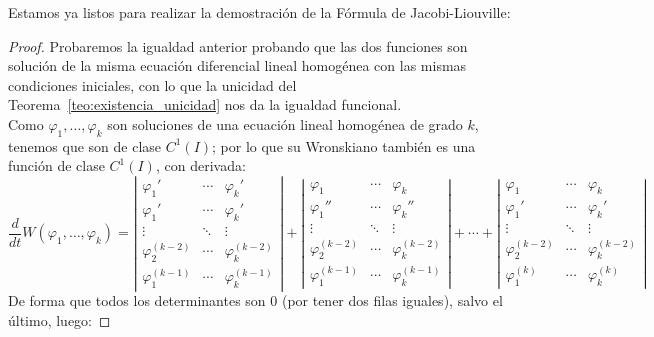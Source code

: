 \noindent
Estamos ya listos para realizar la demostración de la Fórmula de Jacobi-Liouville:
\begin{proof}
    Probaremos la igualdad anterior probando que las dos funciones son solución de la misma ecuación diferencial lineal homogénea con las mismas condiciones iniciales, con lo que la unicidad del Teorema~\ref{teo:existencia_unicidad} nos da la igualdad funcional.\\

    Como $\varphi_1,\ldots,\varphi_k$ son soluciones de una ecuación lineal homogénea de grado $k$, tenemos que son de clase $C^1(I)$; por lo que su Wronskiano también es una función de clase $C^1(I)$, con derivada:
    \begin{equation*}
        \dfrac{d}{dt} W(\varphi_1,\ldots,\varphi_k) = \left|\begin{array}{ccc}
            \varphi_1' & \cdots & \varphi_k' \\
            \varphi_1' & \cdots & \varphi_k' \\
            \vdots & \ddots & \vdots \\
            \varphi_2^{(k-2)} & \cdots & \varphi_k^{(k-2)} \\
            \varphi_1^{(k-1)} & \cdots & \varphi_k^{(k-1)} 
        \end{array}\right| + 
        \left|\begin{array}{ccc}
            \varphi_1 & \cdots & \varphi_k \\
            \varphi_1'' & \cdots & \varphi_k'' \\
            \vdots & \ddots & \vdots \\
            \varphi_2^{(k-2)} & \cdots & \varphi_k^{(k-2)} \\
            \varphi_1^{(k-1)} & \cdots & \varphi_k^{(k-1)} 
        \end{array}\right| + \cdots + 
        \left|\begin{array}{ccc}
            \varphi_1 & \cdots & \varphi_k \\
            \varphi_1' & \cdots & \varphi_k' \\
            \vdots & \ddots & \vdots \\
            \varphi_2^{(k-2)} & \cdots & \varphi_k^{(k-2)} \\
            \varphi_1^{(k)} & \cdots & \varphi_k^{(k)} 
        \end{array}\right| 
    \end{equation*}
    De forma que todos los determinantes son 0 (por tener dos filas iguales), salvo el último, luego:

\end{proof}
